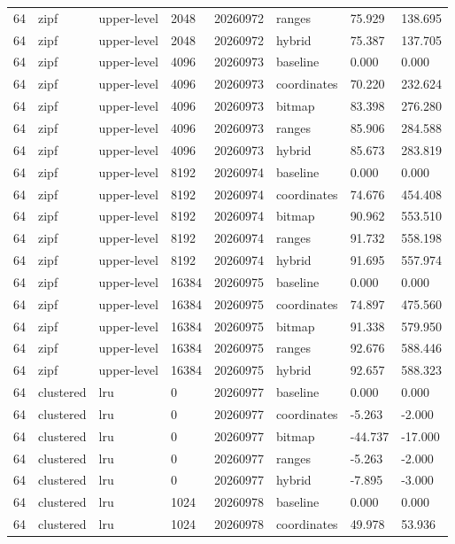 \begin{tabular}{llllllll}
64 & zipf & upper-level & 2048 & 20260972 & ranges & 75.929 & 138.695 \\
64 & zipf & upper-level & 2048 & 20260972 & hybrid & 75.387 & 137.705 \\
64 & zipf & upper-level & 4096 & 20260973 & baseline & 0.000 & 0.000 \\
64 & zipf & upper-level & 4096 & 20260973 & coordinates & 70.220 & 232.624 \\
64 & zipf & upper-level & 4096 & 20260973 & bitmap & 83.398 & 276.280 \\
64 & zipf & upper-level & 4096 & 20260973 & ranges & 85.906 & 284.588 \\
64 & zipf & upper-level & 4096 & 20260973 & hybrid & 85.673 & 283.819 \\
64 & zipf & upper-level & 8192 & 20260974 & baseline & 0.000 & 0.000 \\
64 & zipf & upper-level & 8192 & 20260974 & coordinates & 74.676 & 454.408 \\
64 & zipf & upper-level & 8192 & 20260974 & bitmap & 90.962 & 553.510 \\
64 & zipf & upper-level & 8192 & 20260974 & ranges & 91.732 & 558.198 \\
64 & zipf & upper-level & 8192 & 20260974 & hybrid & 91.695 & 557.974 \\
64 & zipf & upper-level & 16384 & 20260975 & baseline & 0.000 & 0.000 \\
64 & zipf & upper-level & 16384 & 20260975 & coordinates & 74.897 & 475.560 \\
64 & zipf & upper-level & 16384 & 20260975 & bitmap & 91.338 & 579.950 \\
64 & zipf & upper-level & 16384 & 20260975 & ranges & 92.676 & 588.446 \\
64 & zipf & upper-level & 16384 & 20260975 & hybrid & 92.657 & 588.323 \\
64 & clustered & lru & 0 & 20260977 & baseline & 0.000 & 0.000 \\
64 & clustered & lru & 0 & 20260977 & coordinates & -5.263 & -2.000 \\
64 & clustered & lru & 0 & 20260977 & bitmap & -44.737 & -17.000 \\
64 & clustered & lru & 0 & 20260977 & ranges & -5.263 & -2.000 \\
64 & clustered & lru & 0 & 20260977 & hybrid & -7.895 & -3.000 \\
64 & clustered & lru & 1024 & 20260978 & baseline & 0.000 & 0.000 \\
64 & clustered & lru & 1024 & 20260978 & coordinates & 49.978 & 53.936 \\

\end{tabular}
